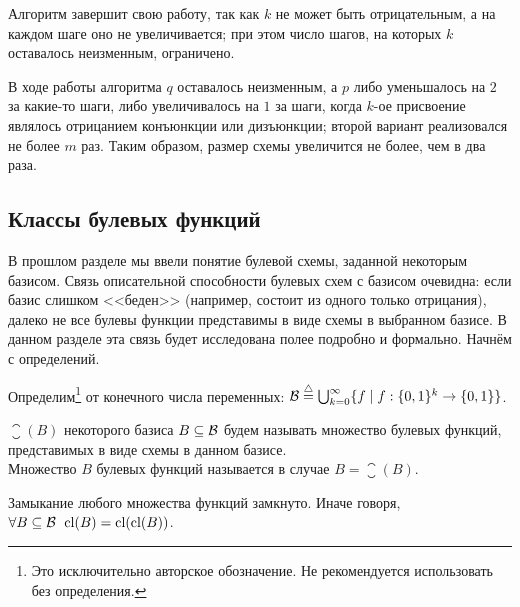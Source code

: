 \begin{Answer}
    Алгоритм завершит свою работу, так как $ k $ не может быть отрицательным,
    а на каждом шаге оно не увеличивается;
    при этом число шагов, на которых $ k $ оставалось неизменным, ограничено.

    В ходе работы алгоритма $ q $ оставалось неизменным,
    а $ p $ либо уменьшалось на $ 2 $ за какие-то шаги,
    либо увеличивалось на $ 1 $ за шаги, когда $ k $-ое присвоение являлось отрицанием конъюнкции или дизъюнкции;
    второй вариант реализовался не более $ m $ раз.
    Таким образом, размер схемы увеличится не более, чем в два раза.
\end{Answer}



\subsection{Классы булевых функций}
\label{subsec:boolean:boolean_functions_classes}

В прошлом разделе мы ввели понятие булевой схемы, заданной некоторым базисом.
Связь описательной способности булевых схем с базисом очевидна:
если базис слишком <<беден>> (например, состоит из одного только отрицания),
далеко не все булевы функции представимы в виде схемы в выбранном базисе.
В данном разделе эта связь будет исследована полее подробно и формально.
Начнём с определений.


\begin{definition}
    \label{definition:boolean:all_boolean_functions}
    Определим\footnote{Это исключительно авторское обозначение. Не рекомендуется использовать без определения.}
     от конечного числа переменных:
    $ \mathcal{B} \overset{\triangle}{=} \bigcup_{k=0}^\infty \{ f \mid f: \{0, 1\}^k \rightarrow \{0, 1\} \} $.
\end{definition}


\begin{definition}
    \label{definition:boolean:closure}
     $ \closure (B) $ некоторого базиса $ B \subseteq \mathcal{B} $ будем называть множество булевых функций,
    представимых в виде схемы в данном базисе.
    \\[0.25\baselineskip]
    Множество $ B $ булевых функций называется  в случае $ B = \closure (B) $.
\end{definition}


\begin{statement}
    \label{statement:boolean:closure_is_closed}
    Замыкание любого множества функций замкнуто.
    Иначе говоря, $ \forall B \subseteq \mathcal{B} \;\, \operatorname*{\textnormal{cl}}(B) = \operatorname*{\textnormal{cl}}(\operatorname*{\textnormal{cl}}(B)) $.
\end{statement}


